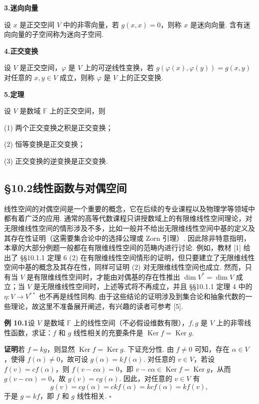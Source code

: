 \documentclass[UTF8,12pt,a4paper,fontset=fandol]{ctexart}
\begin{document}
\noindent\textbf{3.\quad 迷向向量}

设 $x$ 是正交空间 $V$ 中的非零向量，若 $g(x,x)=0$，则称 $x$ 是迷向向量. 含有迷向向量的子空间称为迷向子空间.

\noindent\textbf{4.\quad 正交变换}

设 $V$ 是正交空间，$\varphi$ 是 $V$ 上的可逆线性变换，若 $g(\varphi(x),\varphi(y))=g(x,y)$ 对任意的 $x,y\in V$ 成立，则称 $\varphi$ 是 $V$ 上的正交变换.

\noindent\textbf{5.\quad 定理}

设 $V$ 是数域 $\mathbb{F}$ 上的正交空间，则

(1) 两个正交变换之积是正交变换；

(2) 恒等变换是正交变换；

(3) 正交变换的逆变换是正交变换.

\subsection*{§10.2\quad 线性函数与对偶空间}

线性空间的对偶空间是一个重要的概念，它在后续的专业课程以及物理学等领域中都有着广泛的应用. 通常的高等代数课程只讲授数域上的有限维线性空间理论，对无限维线性空间的情形涉及不多，比如一般并不给出无限维线性空间中基的定义及其存在性证明（这需要集合论中的选择公理或 Zorn 引理）. 因此除非特意指明，本章的大部分例题一般都在有限维线性空间的范畴内进行讨论. 例如，教材 [1] 给出了 §§10.1.1 定理 6 (2) 在有限维线性空间情形的证明，但只要建立了无限维线性空间中基的概念及其存在性，同样可证明 (2) 对无限维线性空间也成立. 然而，只有当 $V$ 是有限维线性空间时，才能由对偶基的存在性推出 $\dim V^*=\dim V$ 成立；当 $V$ 是无限维线性空间时，上述等式将不再成立，并且 §§10.1.1 定理 4 中的 $\eta:V\to V^{**}$ 也不再是线性同构. 由于这些结论的证明涉及到集合论和抽象代数的一些理论，故这里不准备展开阐述，有兴趣的读者可参考 [5].

\noindent\textbf{例 10.1}\quad 设 $V$ 是数域 $\mathbb{F}$ 上的线性空间（不必假设维数有限），$f,g$ 是 $V$ 上的非零线性函数，求证：$f$ 和 $g$ 线性相关的充要条件是 $\operatorname{Ker}f=\operatorname{Ker}g$.

\noindent\textbf{证明}\quad 若 $f=kg$，则显然 $\operatorname{Ker}f=\operatorname{Ker}g$. 下证充分性. 由 $f\ne0$ 可知，存在 $\alpha\in V$，使得 $f(\alpha)\ne0$，故可设 $g(\alpha)=kf(\alpha)$. 对任意的 $v\in V$，若设 $f(v)=cf(\alpha)$，则 $f(v-c\alpha)=0$，即 $v-c\alpha\in\operatorname{Ker}f=\operatorname{Ker}g$，从而 $g(v-c\alpha)=0$，故 $g(v)=cg(\alpha)$. 因此，对任意的 $v\in V$ 有
\[
g(v)=cg(\alpha)=ckf(\alpha)=kcf(\alpha)=kf(v),
\]
于是 $g=kf$，即 $f$ 和 $g$ 线性相关. $\square$
\end{document}
